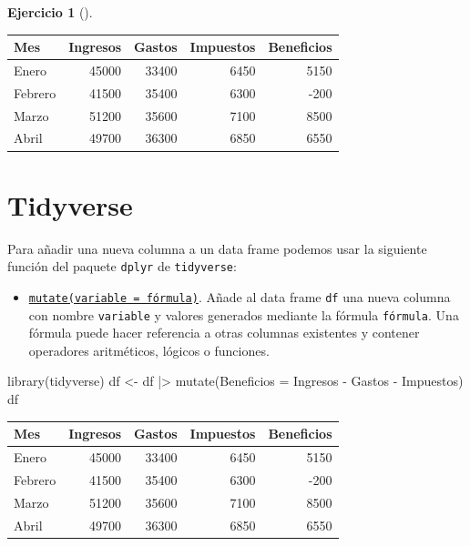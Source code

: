 \documentclass[
  a4paper,
]{scrreport}
\newenvironment{Shaded}{\begin{snugshade}}{\end{snugshade}}
\newcommand{\AttributeTok}[1]{\textcolor[rgb]{0.40,0.45,0.13}{#1}}
\newcommand{\FunctionTok}[1]{\textcolor[rgb]{0.28,0.35,0.67}{#1}}
\newcommand{\NormalTok}[1]{\textcolor[rgb]{0.00,0.23,0.31}{#1}}
\newcommand{\OtherTok}[1]{\textcolor[rgb]{0.00,0.23,0.31}{#1}}
\newcommand{\SpecialCharTok}[1]{\textcolor[rgb]{0.37,0.37,0.37}{#1}}
\providecommand{\tightlist}{%
  \setlength{\itemsep}{0pt}\setlength{\parskip}{0pt}}\usepackage{longtable,booktabs,array}
\theoremstyle{definition}
\newtheorem{exercise}{Ejercicio}[chapter]
\theoremstyle{remark}
\begin{document}
\begin{exercise}[]
\begin{enumerate}
\begin{tcolorbox}
  \begin{longtable}[]{@{}lrrrr@{}}
  \toprule\noalign{}
  Mes & Ingresos & Gastos & Impuestos & Beneficios \\
  \midrule\noalign{}
  \endhead
  \bottomrule\noalign{}
  \endlastfoot
  Enero & 45000 & 33400 & 6450 & 5150 \\
  Febrero & 41500 & 35400 & 6300 & -200 \\
  Marzo & 51200 & 35600 & 7100 & 8500 \\
  Abril & 49700 & 36300 & 6850 & 6550 \\
  \end{longtable}

  \section{Tidyverse}

  Para añadir una nueva columna a un data frame podemos usar la
  siguiente función del paquete \texttt{dplyr} de \texttt{tidyverse}:

  \begin{itemize}
  \tightlist
  \item
    \href{https://dplyr.tidyverse.org/reference/mutate.html}{\texttt{mutate(variable\ =\ fórmula)}}.
    Añade al data frame \texttt{df} una nueva columna con nombre
    \texttt{variable} y valores generados mediante la fórmula
    \texttt{fórmula}. Una fórmula puede hacer referencia a otras
    columnas existentes y contener operadores aritméticos, lógicos o
    funciones.
  \end{itemize}

\begin{Shaded}
\begin{Highlighting}[]
\FunctionTok{library}\NormalTok{(tidyverse)}
\NormalTok{df }\OtherTok{\textless{}{-}}\NormalTok{ df }\SpecialCharTok{|\textgreater{}}
    \FunctionTok{mutate}\NormalTok{(}\AttributeTok{Beneficios =}\NormalTok{ Ingresos }\SpecialCharTok{{-}}\NormalTok{ Gastos }\SpecialCharTok{{-}}\NormalTok{ Impuestos)}
\NormalTok{df}
\end{Highlighting}
\end{Shaded}

  \begin{longtable}[]{@{}lrrrr@{}}
  \toprule\noalign{}
  Mes & Ingresos & Gastos & Impuestos & Beneficios \\
  \midrule\noalign{}
  \endhead
  \bottomrule\noalign{}
  \endlastfoot
  Enero & 45000 & 33400 & 6450 & 5150 \\
  Febrero & 41500 & 35400 & 6300 & -200 \\
  Marzo & 51200 & 35600 & 7100 & 8500 \\
  Abril & 49700 & 36300 & 6850 & 6550 \\
  \end{longtable}


\end{tcolorbox}
\end{enumerate}
\end{exercise}
\end{document}

